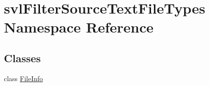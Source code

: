 \hypertarget{namespacesvl_filter_source_text_file_types}{\section{svl\-Filter\-Source\-Text\-File\-Types Namespace Reference}
\label{namespacesvl_filter_source_text_file_types}
}
\subsection*{Classes}
\begin{DoxyCompactItemize}
\item 
class \hyperlink{classsvl_filter_source_text_file_types_1_1_file_info}{File\-Info}
\end{DoxyCompactItemize}

